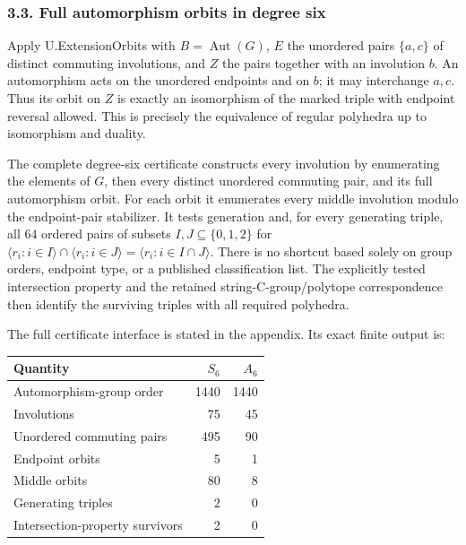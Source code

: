 \documentclass[
  11pt,
  a4paper,
]{article}
\newcounter{none} %
\begin{document}
\subsubsection{3.3. Full automorphism orbits in degree
six}\label{full-automorphism-orbits-in-degree-six}

Apply U.ExtensionOrbits with \(B=\operatorname{Aut}(G)\), \(E\) the
unordered pairs \(\{a,c\}\) of distinct commuting involutions, and \(Z\)
the pairs together with an involution \(b\). An automorphism acts on the
unordered endpoints and on \(b\); it may interchange \(a,c\). Thus its
orbit on \(Z\) is exactly an isomorphism of the marked triple with
endpoint reversal allowed. This is precisely the equivalence of regular
polyhedra up to isomorphism and duality.

The complete degree-six certificate constructs every involution by
enumerating the elements of \(G\), then every distinct unordered
commuting pair, and its full automorphism orbit. For each orbit it
enumerates every middle involution modulo the endpoint-pair stabilizer.
It tests generation and, for every generating triple, all 64 ordered
pairs of subsets \(I,J\subseteq\{0,1,2\}\) for
\(\langle r_i:i\in I\rangle\cap\langle r_i:i\in J\rangle=\langle r_i:i\in I\cap J\rangle\).
There is no shortcut based solely on group orders, endpoint type, or a
published classification list. The explicitly tested intersection
property and the retained string-C-group/polytope correspondence then
identify the surviving triples with all required polyhedra.

The full certificate interface is stated in the appendix. Its exact
finite output is:

{\def\LTcaptype{none} %
\begin{longtable}[]{@{}lrr@{}}
\toprule\noalign{}
Quantity & \(S_6\) & \(A_6\) \\
\midrule\noalign{}
\endhead
\bottomrule\noalign{}
\endlastfoot
Automorphism-group order & 1440 & 1440 \\
Involutions & 75 & 45 \\
Unordered commuting pairs & 495 & 90 \\
Endpoint orbits & 5 & 1 \\
Middle orbits & 80 & 8 \\
Generating triples & 2 & 0 \\
Intersection-property survivors & 2 & 0 \\
\end{longtable}
}
\end{document}
